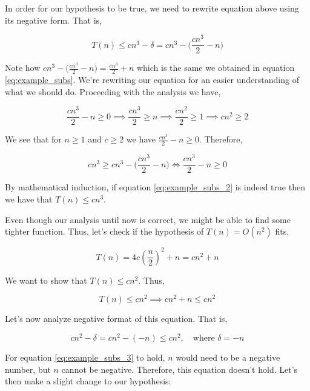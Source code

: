\documentclass[a4paper,10pt]{article}
\newcommand{\hlt}[1]{\colorbox{color3}{#1}}
\begin{document}
In order for our hypothesis to be true, we need to rewrite equation above using its negative form. That is, 

\begin{equation}
    T(n) \leq cn^3 - \delta = cn^3 - \Big(  \frac{cn^3}{2} - n \Big)
\end{equation}

Note how $cn^3 - \Big(  \frac{cn^3}{2} - n \Big) = \frac{cn^3}{2} + n$ which is the same we obtained in equation \ref{eq:example_subs}. We're rewriting our equation for an easier understanding of what we should do. Proceeding with the analysis we have, 

\begin{equation}
    \frac{cn^3}{2} - n \geq 0 \implies \frac{cn^3}{2} \geq n \implies \frac{cn^2}{2} \geq 1 \implies cn^2 \geq 2
\end{equation}

We see that for $n \geq 1$ and $c \geq 2$ we have $\frac{cn^3}{2} - n \geq 0$. Therefore, 

\begin{equation}\label{eq:example_subs_2}
    cn^3 \geq cn^3 - \Big(  \frac{cn^3}{2} - n \Big) \iff \frac{cn^3}{2} - n \geq 0
\end{equation}

By mathematical induction, if equation \ref{eq:example_subs_2} is indeed true then we have that $T(n) \leq cn^3$. 

Even though our analysis until now is correct, we might be able to find some tighter function. Thus, let's check if the hypothesis of $T(n) = O(n^2)$ fits. 

\begin{equation}
    T(n) = 4c(\frac{n}{2})^2 + n = cn^2 + n
\end{equation}

We want to show that $T(n) \leq cn^2$. Thus, 

\begin{equation}
    T(n) \leq cn^2 \implies cn^2 + n \leq cn^2
\end{equation}

Let's now analyze negative format of this equation. That is, 

\begin{equation}\label{eq:example_subs_3}
    cn^2 - \delta = cn^2 - ( - n) \leq cn^2, \quad \text{where } \delta = -n
\end{equation}

For equation \ref{eq:example_subs_3} to hold, $n$ would need to be a negative number, but \hlt{$n$ cannot be negative}. Therefore, this equation doesn't hold. Let's then make a slight change to our hypothesis:
\end{document}
